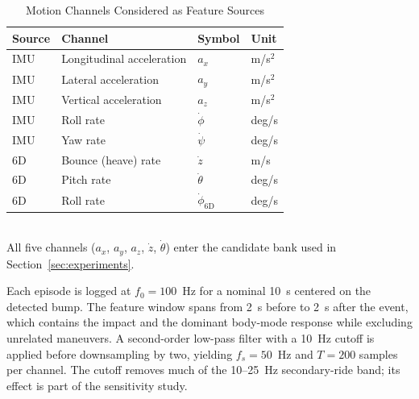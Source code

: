 \documentclass[lettersize,journal]{IEEEtran}
\newif\ifdraftnotes
\newcommand{\draftnote}[1]{\ifdraftnotes\textcolor{red}{\textbf{[TODO: #1]}}\fi}
\begin{document}
\begin{table}[t]
\caption{Motion Channels Considered as Feature Sources}
\label{tab:channels}
\centering
\setlength{\tabcolsep}{4pt}
\begin{tabular}{llll}
\toprule
Source & Channel & Symbol & Unit \\
\midrule
IMU & Longitudinal acceleration & $a_x$ & m/s$^2$ \\
IMU & Lateral acceleration & $a_y$ & m/s$^2$ \\
IMU & Vertical acceleration & $a_z$ & m/s$^2$ \\
IMU & Roll rate & $\dot\phi$ & deg/s \\
IMU & Yaw rate & $\dot\psi$ & deg/s \\
6D & Bounce (heave) rate & $\dot z$ & m/s \\
6D & Pitch rate & $\dot\theta$ & deg/s \\
6D & Roll rate & $\dot\phi_{6\mathrm{D}}$ & deg/s \\
\bottomrule
\end{tabular}
\\[2pt]
All five channels ($a_x$, $a_y$, $a_z$, $\dot z$, $\dot\theta$) enter the candidate bank used in Section~\ref{sec:experiments}. \draftnote{State the sensor models, sampling rates, and mounting locations.}
\end{table}

Each episode is logged at $f_0=100$~Hz for a nominal 10~s centered on the detected bump. The feature window spans from 2~s before to 2~s after the event, which contains the impact and the dominant body-mode response while excluding unrelated maneuvers. A second-order low-pass filter with a 10~Hz cutoff is applied before downsampling by two, yielding $f_s=50$~Hz and $T=200$ samples per channel. The cutoff removes much of the 10--25~Hz secondary-ride band; its effect is part of the sensitivity study.
\end{document}
